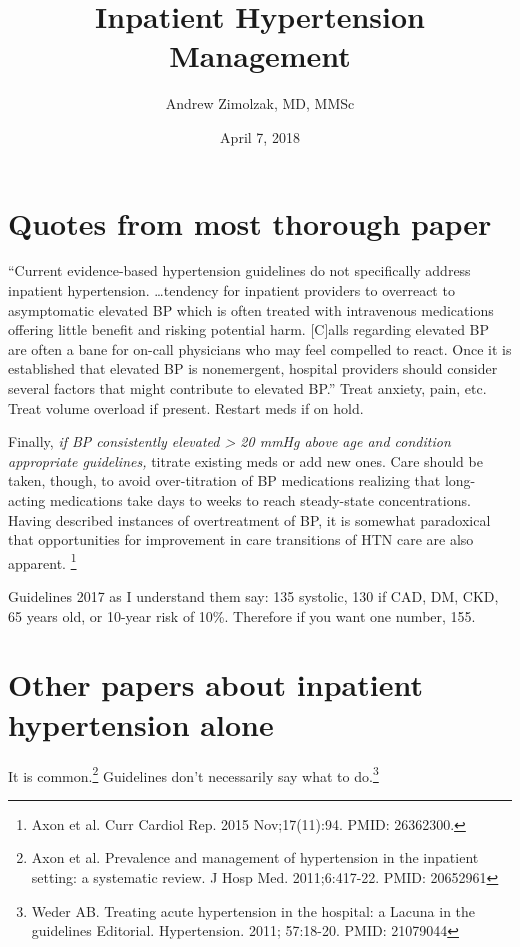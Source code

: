\documentclass{tufte-handout}
\title{Inpatient Hypertension Management}
\author{Andrew Zimolzak, MD, MMSc}
\date{April 7, 2018}
\begin{document}
\maketitle


\section{Quotes from most thorough paper}

``Current evidence-based hypertension guidelines do not specifically
address inpatient hypertension. \ldots{}tendency for inpatient
providers to overreact to asymptomatic elevated BP which is often
treated with intravenous medications offering little benefit and
risking potential harm. [C]alls regarding elevated BP are often a bane
for on-call physicians who may feel compelled to react. Once it is
established that elevated BP is nonemergent, hospital providers should
consider several factors that might contribute to elevated BP.'' Treat
anxiety, pain, etc. Treat volume overload if present. Restart meds if
on hold.

Finally, \emph{if BP consistently elevated > 20 mmHg above age and
  condition appropriate guidelines,} titrate existing meds or add new
ones. Care should be taken, though, to avoid over-titration of BP
medications realizing that long-acting medications take days to weeks
to reach steady-state concentrations. Having described instances of
overtreatment of BP, it is somewhat paradoxical that opportunities for
improvement in care transitions of HTN care are also
apparent. \footnote{Axon et al. Curr Cardiol Rep. 2015 Nov;17(11):94.
  PMID: 26362300.}

Guidelines 2017 as I understand them say: 135 systolic, 130 if CAD,
DM, CKD, 65 years old, or 10-year risk of 10\%. Therefore if you want
one number, 155.

\section{Other papers about inpatient hypertension alone}

It is common.\footnote{Axon et al. Prevalence and management of
  hypertension in the inpatient setting: a systematic review. J Hosp
  Med. 2011;6:417-22. PMID: 20652961} Guidelines don't necessarily say
what to do.\footnote{Weder AB. Treating acute hypertension in the
  hospital: a Lacuna in the guidelines Editorial. Hypertension. 2011;
  57:18-20. PMID: 21079044}
\end{document}
